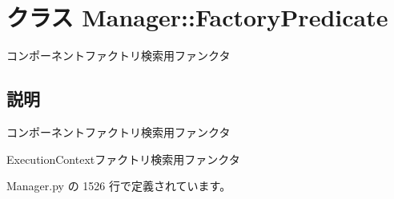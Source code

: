 \section{クラス Manager::FactoryPredicate}
\label{classsource__py_1_1_manager_1_1_manager_1_1_factory_predicate}
コンポーネントファクトリ検索用ファンクタ  




\subsection{説明}
コンポーネントファクトリ検索用ファンクタ 

ExecutionContextファクトリ検索用ファンクタ 

 Manager.py の 1526 行で定義されています。
